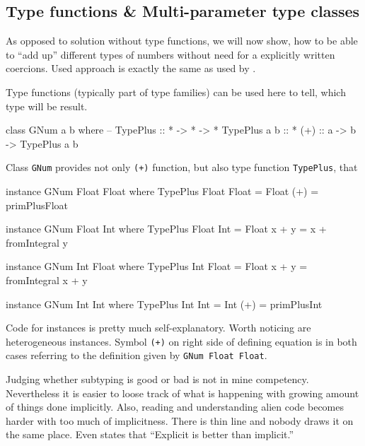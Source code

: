 \documentclass[11pt,oneside,draft]{fithesis2}
\newcommand\uv[1]{``#1''}
\theoremstyle{definition}
\begin{document}
\subsection{Type functions \& Multi-parameter type classes}

As opposed to solution without type functions, we will
now show, how to be able to \uv{add up} different types of numbers
without need for a explicitly written coercions. Used approach is
exactly the same as used by \cite{spjones:2009:funTypesFun}.

Type functions (typically part of type families) can be used here
to tell, which type will be result.
\begin{code}
class GNum a b where
    -- TypePlus :: * -> * -> *
    TypePlus a b :: *
    (+) :: a -> b -> TypePlus a b
\end{code}
Class \texttt{GNum} provides not only \texttt{(+)} function, but
also type function \texttt{TypePlus}, that

\begin{code}
instance GNum Float Float where
    TypePlus Float Float = Float
    (+) = primPlusFloat

instance GNum Float Int where
    TypePlus Float Int = Float
    x + y = x + fromIntegral y

instance GNum Int Float where
    TypePlus Int Float = Float
    x + y = fromIntegral x + y

instance GNum Int Int where
    TypePlus Int Int = Int
    (+) = primPlusInt
\end{code}

Code for instances is pretty much self-explanatory.
Worth noticing are heterogeneous instances. Symbol
\texttt{(+)} on right side of defining equation is
in both cases referring to the definition given
by \texttt{GNum Float Float}.

Judging whether subtyping is good or bad is not in mine
competency. Nevertheless it is easier to loose track of what is happening
with growing amount of things done implicitly.  Also, reading and
understanding alien code becomes harder with too much of
implicitness. There is thin line and nobody draws it on the same place.
Even \cite{python:zen} states that \uv{Explicit is better than implicit.}

\end{document}
